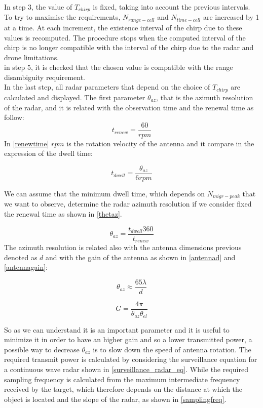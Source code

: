 In step 3, the value of $T_{chirp}$ is fixed, taking into account the previous intervals. To try to maximise the requirements, $N_{range-cell}$ and $N_{time-cell}$ are increased by 1 at a time. At each increment, the existence interval of the chirp due to these values is recomputed. The procedure stops when the computed interval of the chirp is no longer compatible with the interval of the chirp due to the radar and drone limitations.\\
in step 5, it is checked that the chosen value is compatible with the range disambiguity requirement.\\
In the last step, all radar parameters that depend on the choice of $T_{chirp}$ are calculated and displayed.
The first parameter $\theta_{az}$, that is the azimuth resolution of the radar, and it is related with the observation time and the renewal time as follow:
\begin{equation}
t_{renew}=\frac{60}{r p m}
\label{renewtime}
\end{equation}
In \ref{renewtime} $rpm$ is the rotation velocity of the antenna and it compare in the expression of the dwell time:

\begin{equation}
t_{d w e l l}=\frac{\theta_{a z}}{6 r p m}
\label{dwelltime}
\end{equation}

We can assume that the minimum dwell time, which depends on $N_{migr-peak}$ that we want to observe, determine the radar azimuth resolution if we consider fixed the renewal time as shown in \ref{thetaz}.

\begin{equation}
\theta_{az}= \frac{t_{dwell} 360}{t_{renew}}
\label{thetaz}
\end{equation}
The azimuth resolution is related also with the antenna dimensions previous denoted as $d$ and with the gain of the antenna as shown in \ref{antennad} and \ref{antennagain}:

\begin{equation}
\theta_{a z}\approx \frac{65 \lambda}{d}
\label{antennad}
\end{equation}

\begin{equation}
G=\frac{4 \pi}{\theta_{a z} \theta_{e l}}
\label{antennagain}
\end{equation}

So as we can understand it is an important parameter and it is useful to minimize it in order to have an higher gain and so a lower transmitted power, a possible way to decrease $\theta_{az}$ is to slow down the speed of antenna rotation.
The required transmit power is calculated by considering the surveillance equation for a continuous wave radar shown in \ref{surveillance_radar_eq}. While the required sampling frequency is calculated from the maximum intermediate frequency received by the target, which therefore depends on the distance at which the object is located and the slope of the radar, as shown in \ref{samplingfreq}. 


